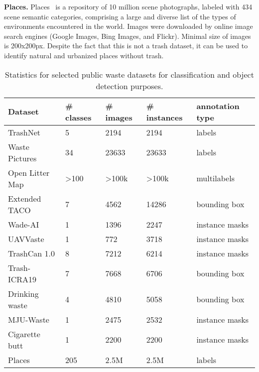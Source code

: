 \documentclass{article}
\begin{document}
\textbf{Places.} Places~\cite{places} is a repository of 10 million scene photographs, labeled with 434 scene semantic categories, comprising a large and diverse list of the types of environments encountered in the world. Images were downloaded by online image search engines (Google Images, Bing
Images, and Flickr). Minimal size of images is 200x200px. Despite the fact that this is not a trash dataset, it can be used to identify natural and urbanized places without trash.

{
\begin{table}[!hbt]
\centering
\caption{Statistics for selected public waste datasets for classification and object detection purposes.}
\label{tab:dataset_stats}
\begin{tabular}{lllll}
\hline
\textbf{Dataset}         & \textbf{\# classes}     & \textbf{\# images}    & \textbf{\# instances}  & \textbf{annotation type} \\ \hline
TrashNet        & 5              & 2194         & 2194          & labels \\ 
Waste Pictures  & 34             & 23633        & 23633         & labels \\ 
Open Litter Map   & >100           & >100k         & >100k        & multilabels \\ \hline
Extended TACO    & 7            & 4562         & 14286          & bounding box \\
Wade-AI         & 1              & 1396         & 2247          & instance masks \\
UAVVaste        & 1              & 772          & 3718          & instance masks \\ 
TrashCan 1.0    & 8              & 7212         & 6214          & instance masks \\ 
Trash-ICRA19    & 7              & 7668         & 6706          & bounding box \\ 
Drinking waste  & 4              & 4810         & 5058          & bounding box \\ 
MJU-Waste       & 1              & 2475         & 2532          & instance masks \\  Cigarette butt       & 1              & 2200         & 2200          & instance masks \\ \hline
Places       & 205              & 2.5M         & 2.5M          & labels \\  \hline
\end{tabular}
\end{table}
}
\end{document}
